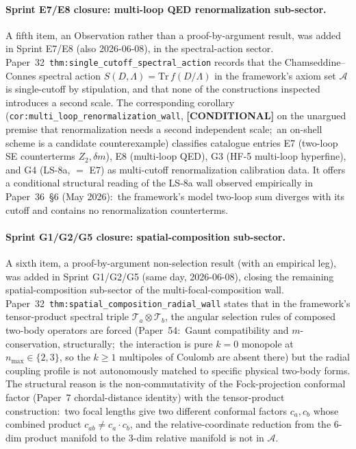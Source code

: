 \documentclass[11pt,a4paper]{article}
\theoremstyle{plain}
\theoremstyle{definition}
\begin{document}
\paragraph{Sprint E7/E8 closure:  multi-loop QED renormalization sub-sector.} A fifth item, an Observation rather than a proof-by-argument result, was added in Sprint E7/E8 (also 2026-06-08), in the spectral-action sector. Paper~32~\texttt{thm:single\_cutoff\_spectral\_action} records that the Chamseddine--Connes spectral action $S(D, \Lambda) = \mathrm{Tr}\, f(D/\Lambda)$ in the framework's axiom set $\mathcal{A}$ is single-cutoff by stipulation, and that none of the constructions inspected introduces a second scale. The corresponding corollary (\texttt{cor:multi\_loop\_renormalization\_wall}, \textbf{[CONDITIONAL]} on the unargued premise that renormalization needs a second independent scale;\ an on-shell scheme is a candidate counterexample) classifies catalogue entries E7 (two-loop SE counterterms $Z_2, \delta m$), E8 (multi-loop QED), G3 (HF-5 multi-loop hyperfine), and G4 (LS-8a, $=$ E7) as multi-cutoff renormalization calibration data. It offers a conditional structural reading of the LS-8a wall observed empirically in Paper~36~\S6 (May 2026):\ the framework's model two-loop sum diverges with its cutoff and contains no renormalization counterterms.

\paragraph{Sprint G1/G2/G5 closure:  spatial-composition sub-sector.} A sixth item, a proof-by-argument non-selection result (with an empirical leg), was added in Sprint G1/G2/G5 (same day, 2026-06-08), closing the remaining spatial-composition sub-sector of the multi-focal-composition wall. Paper~32~\texttt{thm:spatial\_composition\_radial\_wall} states that in the framework's tensor-product spectral triple $\mathcal{T}_a \otimes \mathcal{T}_b$, the angular selection rules of composed two-body operators are forced (Paper~54:\ Gaunt compatibility and $m$-conservation, structurally;\ the interaction is pure $k = 0$ monopole at $n_{\max} \in \{2, 3\}$, so the $k \ge 1$ multipoles of Coulomb are absent there) but the radial coupling profile is not autonomously matched to specific physical two-body forms. The structural reason is the non-commutativity of the Fock-projection conformal factor (Paper~7 chordal-distance identity) with the tensor-product construction:\ two focal lengths give two different conformal factors $c_a, c_b$ whose combined product $c_{ab} \neq c_a \cdot c_b$, and the relative-coordinate reduction from the 6-dim product manifold to the 3-dim relative manifold is not in $\mathcal{A}$.
\end{document}
